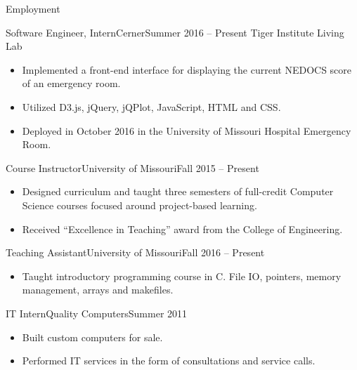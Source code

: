 \documentclass[]{mcdowellcv}
\begin{document}
\begin{cvsection}{Employment}
		\begin{cvsubsection}{Software Engineer, Intern}{Cerner}{Summer 2016 -- Present}
			Tiger Institute Living Lab			
			\begin{itemize}
				\item Implemented a front-end interface for displaying the current NEDOCS score of an emergency room.
				\item Utilized D3.js, jQuery, jQPlot, JavaScript, HTML and CSS.
				\item Deployed in October 2016 in the University of Missouri Hospital Emergency Room.
			\end{itemize}
		\end{cvsubsection}
		
		\begin{cvsubsection}{Course Instructor}{University of Missouri}{Fall 2015 -- Present}	
			\begin{itemize}
				\item Designed curriculum and taught three semesters of full-credit Computer Science courses focused around project-based learning.
				\item Received “Excellence in Teaching” award from the College of Engineering.
			\end{itemize}
		\end{cvsubsection}
		
		\begin{cvsubsection}{Teaching Assistant}{University of Missouri}{Fall 2016 -- Present}
			\begin{itemize}
				\item Taught introductory programming course in C. File IO, pointers, memory management, arrays and makefiles.
			\end{itemize}
		\end{cvsubsection}
		
		\begin{cvsubsection}{IT Intern}{Quality Computers}{Summer 2011}	
			\begin{itemize}
				\item Built custom computers for sale.
				\item Performed IT services in the form of consultations and service calls.
			\end{itemize}
		\end{cvsubsection}
	\end{cvsection}	
	
\end{document}
